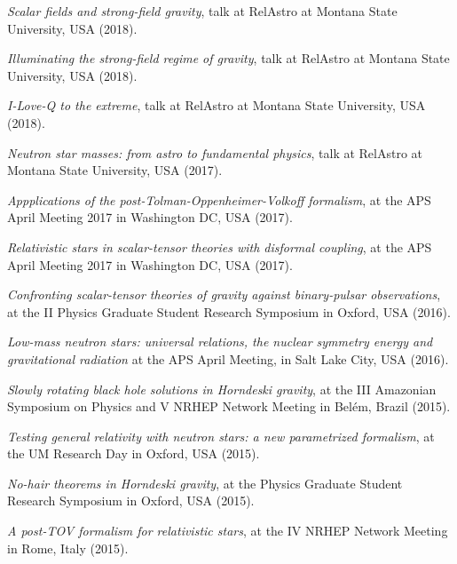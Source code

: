 \documentclass[11pt]{article}
\begin{document}
\begin{etaremune}[topsep=0pt,partopsep=0pt]
    \item
    \emph{Scalar fields and strong-field gravity},
    talk at RelAstro at Montana State University, USA (2018).

    \item
    \emph{Illuminating the strong-field regime of gravity},
    talk at RelAstro at Montana State University, USA (2018).

    \item
    \emph{I-Love-Q to the extreme},
    talk at RelAstro at Montana State University, USA (2018).

    \item
    \emph{Neutron star masses: from astro to fundamental physics},
    talk at RelAstro at Montana State University, USA (2017).

    \item
    \emph{Appplications of the post-Tolman-Oppenheimer-Volkoff formalism},
    at the APS April Meeting 2017
    in Washington DC, USA (2017).

    \item
    \emph{Relativistic stars in scalar-tensor theories with disformal coupling},
    at the APS April Meeting 2017
    in Washington DC, USA (2017).

    \item
    \emph{Confronting scalar-tensor theories of gravity
    against binary-pulsar observations},
    at the II Physics Graduate Student Research Symposium
    in Oxford, USA (2016).

    \item
    \emph{Low-mass neutron stars: universal relations, the nuclear symmetry energy and gravitational radiation}
    at the APS April Meeting,
    in Salt Lake City, USA (2016).

    \item
    \emph{Slowly rotating black hole solutions in Horndeski gravity},
    at the III Amazonian Symposium on Physics and V NRHEP Network Meeting
    in Bel\'em, Brazil (2015).

    \item
    \emph{Testing general relativity with neutron stars: a new
    parametrized formalism},
    at the UM Research Day
    in Oxford, USA (2015).

    \item
    \emph{No-hair theorems in Horndeski gravity},
    at the Physics Graduate Student Research Symposium
    in Oxford, USA (2015).

    \item
    \emph{A post-TOV formalism for relativistic stars},
    at the IV NRHEP Network Meeting
    in Rome, Italy (2015).


\end{etaremune}
\end{document}
